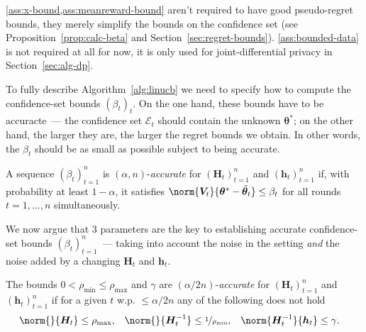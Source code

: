 \documentclass{article}
\renewcommand{\vec}[1]{\bm{#1}}
\newcommand{\inv}[1]{#1^{-1}}
\newcommand{\E}{\mathcal{E}}
\begin{document}
\cref{ass:x-bound,ass:meanreward-bound} aren't required to have good pseudo-regret bounds, they merely simplify the bounds on the confidence set (see Proposition~\ref{prop:calc-beta} and Section~\ref{sec:regret-bounds}). \cref{ass:bounded-data} is not required at all for now, it is only used for joint-differential privacy in Section~\ref{sec:alg-dp}.



To fully describe Algorithm~\ref{alg:linucb} we need to specify how to compute the confidence-set bounds $(\beta_t)_t$. On the one hand, these bounds have to be accuracte~--- the confidence set $\E_t$ should contain the unknown $\vec\theta^*$; on the other hand, the larger they are, the larger the regret bounds we obtain.
In other words, the $\beta_t$ should be as small as possible subject to being accurate.

\begin{definition}\label{def:accurate-beta}
  A sequence $(\beta_t)_{t=1}^n$ is $(\alpha, n)$-\emph{accurate} for
  $(\vec H_t)_{t=1}^n$ and $(\vec h_t)_{t=1}^n$ if, with probability at
  least $1-\alpha$, it satisfies
  $\norm{\vec V_t}{\vec\theta^* - \tilde{\vec\theta}_t} \le \beta_t$
  for all rounds $t=1,\dotsc,n$ simultaneously.
\end{definition}

We now argue that 3 parameters are the key to establishing accurate confidence-set bounds $(\beta_t)_{t=1}^n$~--- taking into account the noise in the setting \emph{and} the noise added by a changing $\vec H_t$ and $\vec h_t$.

\begin{definition}\label{def:accurate-params}
  The bounds $0 < \rho_{\min} \le \rho_{\max}$ and $\gamma$ are
  $(\alpha/2n)$-\emph{accurate} for $(\vec H_t)_{t=1}^n$ and $(\vec h_t)_{t=1}^n$ if for a given $t$ w.p. $\leq \alpha/2n$ any of the following does not hold
  \begin{align*}
    \norm{}{\vec H_t} &\le \rho_{\max},
    &\norm{}{\inv{\vec H_t}} &\le \nicefrac{1}{\rho_{\min}},
    &\norm{\inv{\vec H_t}}{\vec h_t} &\le \gamma.
  \end{align*}
\end{definition}
\end{document}
